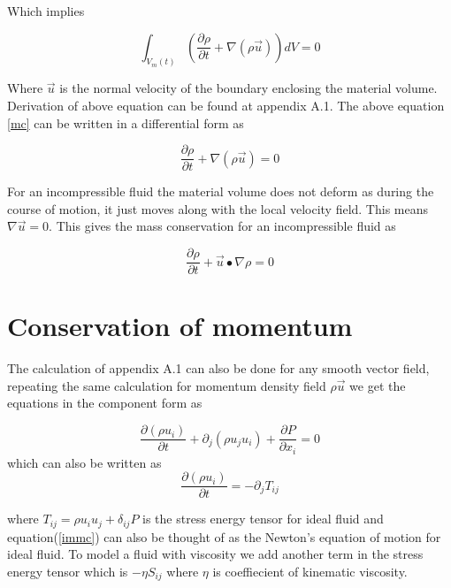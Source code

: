 \documentclass{article}		%
\begin{document}
	Which implies 
	
	\begin{equation}
	\int_{V_m(t)}  \left( \frac{\partial \rho }{\partial t} +   \nabla \left( \rho \vec{u}\right)  \right) dV =0
	\label{mc}
	\end{equation}
	
	Where $\vec{u}$ is the normal velocity of the boundary enclosing the material volume. Derivation of above equation can be found at appendix A.1. The above equation \ref{mc} can be written in a differential form as 
	
	\begin{equation}
	\frac{\partial \rho }{\partial t} +   \nabla \left( \rho \vec{u}\right) =0
	\end{equation} 
	
	For an incompressible fluid the material volume does not deform as during the course of motion, it just moves along with the local velocity field. This means $\nabla \vec{u} =0 $. This gives the mass conservation for an incompressible fluid as 

	\begin{equation}
	\frac{\partial \rho }{\partial t} +   \vec{u} \bullet \nabla\rho  =0
	\end{equation} 

\section{Conservation of momentum} The calculation of appendix A.1 can also be done for any smooth vector field, repeating the same calculation for momentum density field $\rho \vec{u}$ we get the equations in the component form as  

	\begin{equation}
	\frac{\partial (\rho u_i) }{\partial t} + \partial_j (\rho u_j u_i)  + \frac{\partial P }{\partial x_i} = 0
	\label{immc}	
	\end{equation}
	which can also be written as 
	\begin{equation}
	\frac{\partial (\rho u_i) }{\partial t} = -\partial_jT_{ij} 
	\end{equation}	
	
	where $T_{ij} = \rho u_iu_j + \delta_{ij} P$ is the stress energy tensor for ideal fluid and equation(\ref{immc}) can also be thought of as the Newton's equation of motion for ideal fluid. To model a fluid with viscosity we add another term in the stress energy tensor which is $- \eta S_{ij}$ where $\eta$	is coeffiecient of kinematic viscosity. 
	
\end{document}
